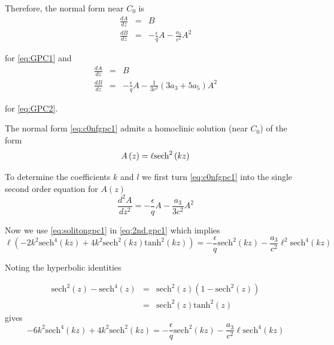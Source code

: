 Therefore, the normal form near $C_0$ is
\begin{subequations}\label{eq:c0nfgpc1}
\begin{eqnarray}
\frac{dA}{dz} &=& B \\
\frac{dB}{dz} &=& -\frac{\epsilon}{q} A - \frac{a_3}{ c^2} A^2
\end{eqnarray}
\end{subequations}

for \eqref{eq:GPC1} and
\begin{subequations}\label{eq:c0nfgpc2}
\begin{eqnarray}
\frac{dA}{dz} &=& B \\
\frac{dB}{dz} &=& -\frac{\epsilon}{q} A - \frac{1}{3 c^2} \left(3 a_3 + 5 a_5 \right) A^2
\end{eqnarray}
\end{subequations}

for \eqref{eq:GPC2}.

The normal form \eqref{eq:c0nfgpc1} admits a homoclinic solution (near $C_0$) of the form 
\begin{equation} \label{eq:solitongpc1}
A\left(z\right) = \ell \space \mathrm{sech}^2\left(k z\right)
\end{equation}

To determine the coefficients $k$ and $l$ we first turn \eqref{eq:c0nfgpc1} into the single
second order equation for $A(z)$
\begin{equation} \label{eq:2nd.gpc1}
\frac{d^2A}{dz^2} = -\frac{\epsilon}{q} A - \frac{a_3}{3 c^2} A^2
\end{equation}

Now we use \eqref{eq:solitongpc1} in \eqref{eq:2nd.gpc1} which implies
\begin{equation}\label{eq:hyperparty1}
\ell \left( -2 k^2 \mathrm{sech}^4(kz) + 4 k^2 \mathrm{sech}^2\left(kz\right) \mathrm{tanh}^2\left(kz\right) \right) = - \frac{\epsilon}{q} \mathrm{sech}^2(kz) - \frac{a_3}{c^2} \ell^2 \mathrm{sech}^4(kz) 
\end{equation}

Noting the hyperbolic identities

\begin{subequations} 
\begin{eqnarray*}
\mathrm{sech}^2\left(z\right) - \mathrm{sech}^4\left(z\right) &=& \mathrm{sech}^2\left(z\right) \left(1 - \mathrm{sech}^2\left(z\right)\right) \\
 &=& \mathrm{sech}^2\left(z\right) \mathrm{tanh}^2\left(z\right)
\end{eqnarray*}
\end{subequations}
gives 
\begin{equation}\label{eq:hyper1}
-6 k^2 \mathrm{sech}^4(kz) + 4 k^2 \mathrm{sech}^2\left(kz\right)  = - \frac{\epsilon}{q} \mathrm{sech}^2(kz) - \frac{a_3}{c^2} \ell \mathrm{sech}^4(kz) 
\end{equation}

